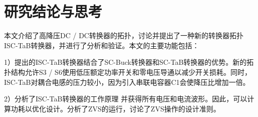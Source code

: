 \documentclass[12pt,a4paper]{report}
\begin{document}
\chapter{研究结论与思考}
本文介绍了高降压DC / DC转换器的拓扑，讨论并提出了一种新的转换器拓扑ISC-TaB转换器，并进行了分析和验证。本文的主要功能包括：

1）提出的ISC-TaB转换器结合了SC-Buck转换器和SC-TaB转换器的优势。新的拓扑结构允许S3 / S6使用低压额定功率开关和零电压导通以减少开关损耗。同时，ISC-TaB对耦合电感的压力较小，因为引入串联电容器C1会使降压比增加一倍。

2）分析了ISC-TaB转换器的工作原理
并获得所有电压和电流波形。因此，可以计算功耗以优化设计。分析了ZVS的运行，讨论了ZVS操作的设计准则。
\end{document}
